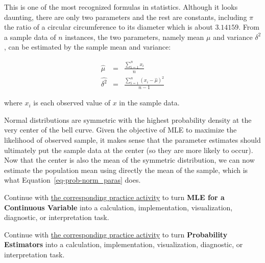 \documentclass[
  letterpaper,
]{scrbook}
\begin{document}
This is one of the most recognized formulas in statistics. Although it
looks daunting, there are only two parameters and the rest are
constants, including \(\pi\) the ratio of a circular circumference to
its diameter which is about \(3.14159\). From a sample data of \(n\)
instances, the two parameters, namely mean \(\mu\) and variance
\(\delta^2\), can be estimated by the sample mean and variance:

\[\begin{aligned}
  \hat{\mu} & = & \frac{\sum_{i=1}^{n} x_i}{n} \\
  \hat{\delta^2} & = & \frac{\sum_{i=1}^{n} (x_i - \hat{\mu})^2}{n-1}
\end{aligned}\]

where \(x_i\) is each observed value of \(x\) in the sample data.

Normal distributions are symmetric with the highest probability density
at the very center of the bell curve. Given the objective of MLE to
maximize the likelihood of observed sample, it makes sense that the
parameter estimates should ultimately put the sample data at the center
(so they are more likely to occur). Now that the center is also the mean
of the symmetric distribution, we can now estimate the population mean
using directly the mean of the sample, which is what
Equation~\hyperref[eq-prob-norm_paras]{{[}eq-prob-norm\_paras{]}} does.

\begin{tcolorbox}[enhanced jigsaw, arc=.35mm, bottomrule=.15mm, bottomtitle=1mm, breakable, colback=white, colbacktitle=quarto-callout-tip-color!10!white, colframe=quarto-callout-tip-color-frame, coltitle=black, left=2mm, leftrule=.75mm, opacityback=0, opacitybacktitle=0.6, rightrule=.15mm, title=\textcolor{quarto-callout-tip-color}{\faLightbulb}\hspace{0.5em}{Put it into practice}, titlerule=0mm, toprule=.15mm, toptitle=1mm]

Continue with \hyperref[sec-pr-04-mle-for-a-continuous-variable]{the
corresponding practice activity} to turn \textbf{MLE for a Continuous
Variable} into a calculation, implementation, visualization, diagnostic,
or interpretation task.

\end{tcolorbox}

\begin{tcolorbox}[enhanced jigsaw, arc=.35mm, bottomrule=.15mm, bottomtitle=1mm, breakable, colback=white, colbacktitle=quarto-callout-tip-color!10!white, colframe=quarto-callout-tip-color-frame, coltitle=black, left=2mm, leftrule=.75mm, opacityback=0, opacitybacktitle=0.6, rightrule=.15mm, title=\textcolor{quarto-callout-tip-color}{\faLightbulb}\hspace{0.5em}{Put it into practice}, titlerule=0mm, toprule=.15mm, toptitle=1mm]

Continue with \hyperref[sec-pr-04-probability-estimators-2]{the
corresponding practice activity} to turn \textbf{Probability Estimators}
into a calculation, implementation, visualization, diagnostic, or
interpretation task.

\end{tcolorbox}
\end{document}
